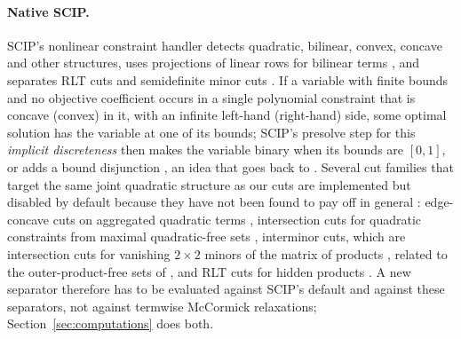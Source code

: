 \paragraph{Native SCIP.}
SCIP's nonlinear constraint handler detects quadratic, bilinear, convex,
concave and other structures, uses projections of linear rows for bilinear
terms \citep{MullerSerranoGleixner2020}, and separates RLT cuts
\citep{BestuzhevaGleixnerAchterberg2025} and semidefinite minor cuts
\citep{BestuzhevaEtAl2025}. If a variable with finite bounds and
no objective coefficient occurs in a single polynomial constraint that is
concave (convex) in it, with an infinite left-hand (right-hand) side, some
optimal solution has the variable at one of its bounds; SCIP's presolve step
for this \emph{implicit discreteness} then makes the variable binary when its bounds are $[0,1]$, or adds a bound
disjunction \citep[Section~4.2.7]{SCIP8report}, an idea that goes back to
\citet{HansenEtAl1993}. Several cut families that target the same joint
quadratic structure as our cuts are implemented but disabled by default
because they have not been found to pay off in general
\citep{BestuzhevaEtAl2025,SCIP10}: edge-concave cuts on aggregated quadratic
terms \citep{MisenerFloudas2012}, intersection cuts for quadratic constraints
from maximal quadratic-free sets
\citep{MunozSerrano2022,ChmielaMunozSerrano2023}, interminor cuts, which are
intersection cuts for vanishing $2\times2$ minors of the matrix of products
\citep[Section~4.11]{SCIP8report}, related to the outer-product-free sets of
\citet{BienstockChenMunoz2020}, and RLT cuts for hidden products
\citep{BestuzhevaGleixnerAchterberg2025}. A new separator therefore has to be
evaluated against SCIP's default and against these separators, not against
termwise McCormick relaxations; Section~\ref{sec:computations} does both.
